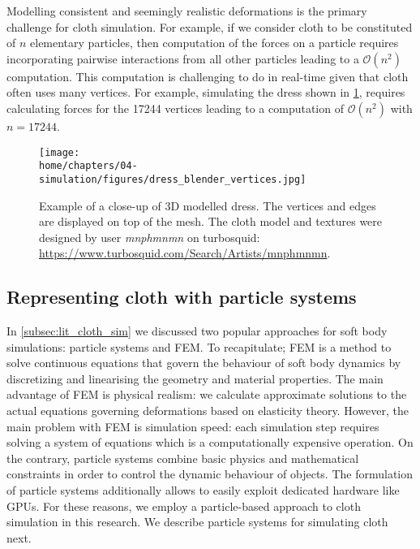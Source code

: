 \documentclass[\home/main.tex]{subfiles}
\begin{document}
Modelling consistent and seemingly realistic deformations is the primary challenge for cloth simulation. For example, if we consider cloth to be constituted of $n$ elementary particles, then computation of the forces on a particle requires incorporating pairwise interactions from all other particles leading to a $\mathcal{O}(n^2)$ computation. This computation is challenging to do in real-time given that cloth often uses many vertices. For example, simulating the dress shown in \cref{fig:dress_blender_vertices}, requires calculating forces for the 17244 vertices leading to a computation of $\mathcal{O}(n^2)$ with $n=17244$.
\begin{figure}
    \centering
    \texttt{[image: \\home/chapters/04-simulation/figures/dress\_blender\_vertices.jpg]}
    \caption[Example of a 3D modelled dress]{Example of a close-up of 3D modelled dress. The vertices and edges are displayed on top of the mesh. The cloth model and textures were designed by user \textit{mnphmnmn} on turbosquid: \url{https://www.turbosquid.com/Search/Artists/mnphmnmn}.}
    \label{fig:dress_blender_vertices}
\end{figure}

\subsection{Representing cloth with particle systems} \label{subsec:sim_particle_system}

In \cref{subsec:lit_cloth_sim} we discussed two popular approaches for soft body simulations: particle systems and \gls{FEM}. To recapitulate; \gls{FEM} is a method to solve continuous equations that govern the behaviour of soft body dynamics by discretizing and linearising the geometry and material properties. The main advantage of \gls{FEM} is physical realism: we calculate approximate solutions to the actual equations governing deformations based on elasticity theory. However, the main problem with \gls{FEM} is simulation speed: each simulation step requires solving a system of equations which is a computationally expensive operation. On the contrary, particle systems combine basic physics and mathematical constraints in order to control the dynamic behaviour of objects. The formulation of particle systems additionally allows to easily exploit dedicated hardware like \glspl{GPU}. For these reasons, we employ a particle-based approach to cloth simulation in this research. We describe particle systems for simulating cloth next.
\end{document}

